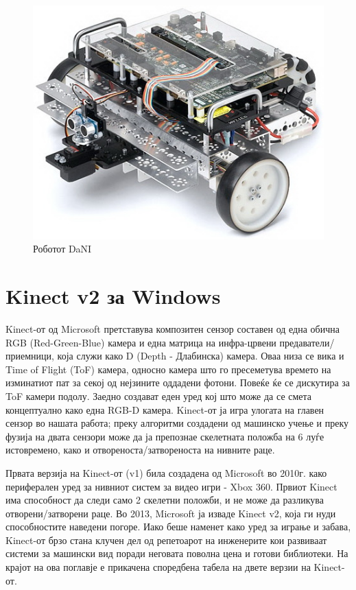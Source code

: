 \documentclass[12pt]{article}
\begin{document}
	\begin{figure}[H]
		\includegraphics[width=0.75\linewidth]{./images/dani_isometric.jpg}
		\centering
		\caption{Роботот DaNI}
		\label{fig:dani_isometric.jpg}
		\end{figure}
\newpage

\section{Kinect v2 за Windows}
	Kinect-от од Microsoft претставува композитен сензор составен од една обична RGB (Red-Green-Blue) камера и една матрица на инфра-црвени предаватели/приемници, која служи како D (Depth - Длабинска) камера. Оваа низа се вика и Time of Flight (ToF) камера, односно камера што го пресеметува времето на изминатиот пат за секој од нејзините оддадени фотони. Повеќе ќе се дискутира за ToF камери подолу. Заедно создават еден уред кој што може да се смета концептуално како една RGB-D камера. Kinect-от ја игра улогата на главен сензор во нашата работа; преку алгоритми создадени од машинско учење и преку фузија на двата сензори може да ја препознае скелетната положба на 6 луѓе истовремено, како и отвореноста/затвореноста на нивните раце.

	Првата верзија на Kinect-от (v1) била создадена од Microsoft во 2010г. како периферален уред за нивниот систем за видео игри - Xbox 360. Првиот Kinect има способност да следи само 2 скелетни положби, и не може да разликува отворени/затворени раце. Во 2013, Microsoft ја изваде Kinect v2, која ги нуди способностите наведени погоре. Иако беше наменет како уред за играње и забава, Kinect-от брзо стана клучен дел од репетоарот на инженерите кои развиваат системи за машински вид поради неговата поволна цена и готови библиотеки. На крајот на ова поглавје е прикачена споредбена табела на двете верзии на Kinect-от.
\end{document}
